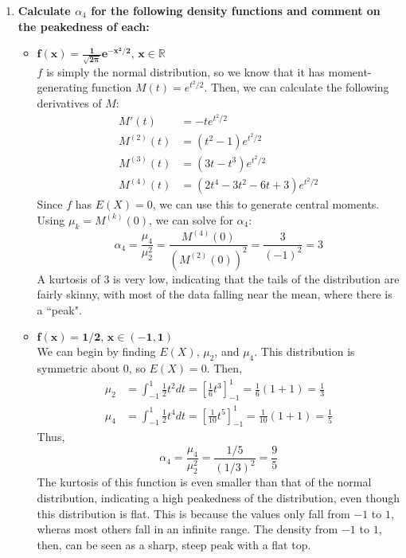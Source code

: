 \documentclass{article}
\newcommand{\R}{\mathbb{R}}
\begin{document}
\begin{enumerate}
	\item \textbf{Calculate $\alpha_4$ for the following density functions and comment on the peakedness of each:}
		\begin{itemize}
			\item $\mathbf{f(x)=\frac{1}{\sqrt{2\pi}}e^{-x^2/2}\text{, }x\in\R}$
				\bigskip \\
				$f$ is simply the normal distribution, so we know that it has moment-generating function $M(t)=e^{t^2/2}$. Then, we can calculate the following derivatives of $M$:
				\begin{align*}
					M'(t) 		&= -te^{t^2/2}					\\
					M^{(2)}(t)	&= (t^2 - 1)e^{t^2/2}			\\
					M^{(3)}(t)	&= (3t-t^3)e^{t^2/2} 			\\
					M^{(4)}(t)	&= (2t^4-3t^2-6t+3)e^{t^2/2}
				\end{align*}
				Since $f$ has $E(X)=0$, we can use this to generate central moments. Using $\mu_k=M^{(k)}(0)$, we can solve for $\alpha_4$:
				\[
					\alpha_4 = \dfrac{\mu_4}{\mu_2^2} = \dfrac{M^{(4)}(0)}{(M^{(2)}(0))^2} = \dfrac{3}{(-1)^2} = 3
				\]
				A kurtosis of 3 is very low, indicating that the tails of the distribution are fairly skinny, with most of the data falling near the mean, where there is a ``peak". 
			
			\pagebreak
			
			\item $\mathbf{f(x)=1/2\text{, }x\in(-1,1)}$
				\bigskip \\
				We can begin by finding $E(X)$, $\mu_2$, and $\mu_4$. This distribution is symmetric about $0$, so $E(X)=0$. Then,
				\begin{align*}
					\mu_2 &= \int^1_{-1} \frac{1}{2}t^2dt = [\frac{1}{6}t^3]^1_{-1} = \frac{1}{6}(1+1) = \frac{1}{3}	\\
					\mu_4 &= \int^1_{-1} \frac{1}{2}t^4dt = [\frac{1}{10}t^5]^1_{-1} = \frac{1}{10}(1+1) = \frac{1}{5}
				\end{align*}
				Thus,
				\[
					\alpha_4 = \dfrac{\mu_4}{\mu_2^2} = \dfrac{1/5}{(1/3)^2} = \dfrac{9}{5}
				\]
				The kurtosis of this function is even smaller than that of the normal distribution, indicating a high peakedness of the distribution, even though this distribution is flat. This is because the values only fall from $-1$ to $1$, wheras most others fall in an infinite range. The density from $-1$ to $1$, then, can be seen as a sharp, steep peak with a flat top.
			

\end{itemize}
\end{enumerate}
\end{document}

